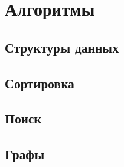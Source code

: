 \chapter{Алгоритмы}
\section{Структуры данных}
\section{Сортировка}
\section{Поиск}
\section{Графы}
